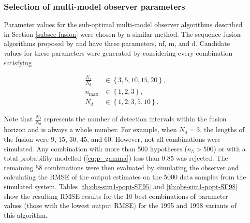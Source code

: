 \subsubsection{Selection of multi-model observer parameters} \label{sim-obs-lin-1-MKF-tuning}

Parameter values for the sub-optimal multi-model observer algorithms described in Section \ref{subsec-fusion} were chosen by a similar method. The sequence fusion algorithms proposed by \cite{robertson_detection_1995} and \cite{robertson_method_1998} have three parameters, \gls{nf}, \gls{m}, and \gls{d}. Candidate values for these parameters were generated by considering every combination satisfying

\begin{equation} \label{eq:sim-sys-siso-MKF-SF-param-values}
	\begin{aligned}
		\frac{N_f}{N_d} &\in \left\{3, 5, 10, 15, 20\right\},  \\
		n_\text{max} &\in \left\{1, 2, 3\right\},  \\
		N_d &\in \left\{1, 2, 3, 5, 10\right\}.
	\end{aligned}
\end{equation}

Note that $\frac{N_f}{N_d}$ represents the number of detection intervals within the fusion horizon and is always a whole number. For example, when $N_d=3$, the lengths of the fusion were 9, 15, 30, 45, and 60. However, not all combinations were simulated. Any combination with more than 500 hypotheses ($n_h>500$) or with a total probability modelled (\ref{eq:p_gamma}) less than 0.85 was rejected. The remaining 58 combinations were then evaluated by simulating the observer and calculating the \gls{RMSE} of the output estimates on the 5000 data samples from the simulated system. Tables \ref{tb:obs-sim1-popt-SF95} and \ref{tb:obs-sim1-popt-SF98} show the resulting \gls{RMSE} results for the 10 best combinations of parameter values (those with the lowest output \gls{RMSE}) for the 1995 and 1998 variants of this algorithm.

